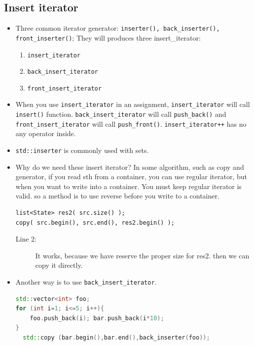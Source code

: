 \documentclass[a4paper,11pt,twoside]{book}
\begin{document}
\subsection{Insert iterator}
\begin{itemize}
\item Three common iterator generator: \texttt{inserter(), back\_inserter(), front\_inserter()};  They will produces three insert\_iterator:
\begin{enumerate}
	\item \texttt{insert\_iterator}
	\item \texttt{back\_insert\_iterator}
	\item \texttt{front\_insert\_iterator}
\end{enumerate}

\item When you use \texttt{insert\_iterator} in an assignment, \texttt{insert\_iterator} will call \texttt{insert()} function.  \newline 
\texttt{back\_insert\_iterator} will call \texttt{push\_back()} and \texttt{front\_insert\_iterator} will call \texttt{push\_front()}. \texttt{insert\_iterator++} has no any operator inside.

\item  \texttt{std::inserter} is commonly used with sets.

\item Why do we need these insert iterator? In some algorithm, such as copy and generator, if you read sth from a container, you can use regular iterator, but when you want to write into a container.  You must keep regular iterator is valid. so a method is to use reverse before you write to a container.

\begin{lstlisting}
list<State> res2( src.size() );
copy( src.begin(), src.end(), res2.begin() ); 
\end{lstlisting}
\begin{description}
	\item[Line 2:] It works, because we have reserve the proper size for res2. then we can copy it directly.
\end{description}

\item Another way is to use \texttt{back\_insert\_iterator}.
\begin{lstlisting}[frame=single, language=c++]
std::vector<int> foo;
for (int i=1; i<=5; i++){ 
	foo.push_back(i); bar.push_back(i*10); 
}
  std::copy (bar.begin(),bar.end(),back_inserter(foo));


\end{lstlisting}
\end{itemize}
\end{document}
